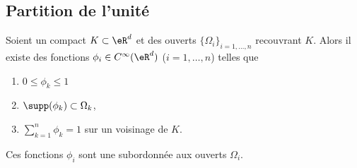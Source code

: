 \subsection{Partition de l'unité}

\begin{theorem}       \label{THOooQFCQooSlgLpz}
	Soient un compact \( K\subset \eR^d\) et des ouverts \( \{ \Omega_i \}_{i=1,\ldots, n}\) recouvrant \( K\). Alors il existe des fonctions \( \phi_i\in  C^{\infty}(\eR^d)\) (\( i=1,\ldots, n\)) telles que
	\begin{enumerate}
		\item
		      \( 0\leq \phi_k\leq 1\)
		\item
		      \( \supp(\phi_k)\subset \Omega_k\),
		\item
		      \( \sum_{k=1}^n\phi_k=1\) sur un voisinage de \( K\).
	\end{enumerate}
	Ces fonctions \( \phi_i\) sont une  subordonnée aux ouverts \( \Omega_i\).
\end{theorem}


